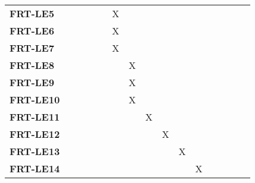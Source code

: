 \documentclass[12pt, titlepage]{article}
\begin{document}
\begin{landscape}
\begin{longtable}{|l|cccccccccccc|}
		\textbf{FRT-LE5} & ~                                                         & ~             & ~             & X             & ~             & ~             & ~             & ~             & ~             & ~             & ~ &~\\
		\textbf{FRT-LE6} & ~                                                         & ~             & ~             & X             & ~             & ~             & ~             & ~             & ~             & ~             & ~ &~\\
		\textbf{FRT-LE7} & ~                                                         & ~             & ~             & X             & ~             & ~             & ~             & ~             & ~             & ~             & ~ &~\\
		\textbf{FRT-LE8} & ~                                                         & ~             & ~             & ~             & X             & ~             & ~             & ~             & ~             & ~             & ~ &~\\
		\textbf{FRT-LE9} & ~                                                         & ~             & ~             & ~             & X             & ~             & ~             & ~             & ~             & ~             & ~ &~\\
		\textbf{FRT-LE10} & ~                                                         & ~             & ~             & ~             & X             & ~             & ~             & ~             & ~             & ~             & ~ &~\\
		\textbf{FRT-LE11} & ~                                                         & ~             & ~             & ~             & ~             & X             & ~             & ~             & ~             & ~             & ~ &~\\
		\textbf{FRT-LE12} & ~                                                         & ~             & ~             & ~             & ~             & ~             & X             & ~             & ~             & ~             & ~ &~\\
		\textbf{FRT-LE13} & ~                                                         & ~             & ~             & ~             & ~             & ~             & ~             & X             & ~             & ~             & ~ &~\\
		\textbf{FRT-LE14} & ~                                                         & ~             & ~             & ~             & ~             & ~             & ~             & ~             & X             & ~             & ~ &~\\

\end{longtable}
\end{landscape}
\end{document}

